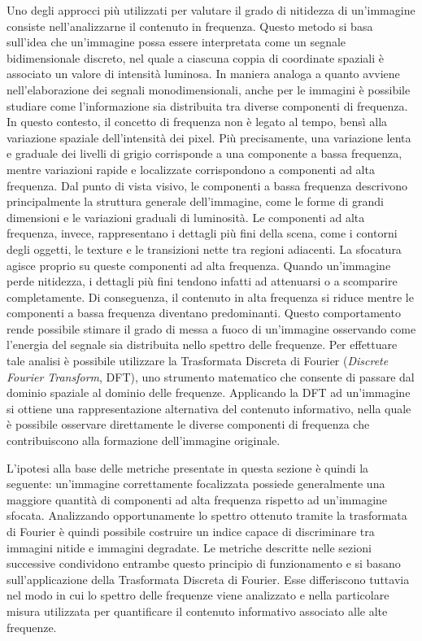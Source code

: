 \documentclass[
    target=bach,
    aauheader=,
    style=
]{thud}
\begin{document}
Uno degli approcci più utilizzati per valutare il grado di nitidezza di un'immagine consiste nell'analizzarne il contenuto in frequenza. Questo metodo si basa sull'idea che un'immagine possa essere interpretata come un segnale bidimensionale discreto, nel quale a ciascuna coppia di coordinate spaziali è associato un valore di intensità luminosa. In maniera analoga a quanto avviene nell'elaborazione dei segnali monodimensionali, anche per le immagini è possibile studiare come l'informazione sia distribuita tra diverse componenti di frequenza. In questo contesto, il concetto di frequenza non è legato al tempo, bensì alla variazione spaziale dell'intensità dei pixel. Più precisamente, una variazione lenta e graduale dei livelli di grigio corrisponde a una componente a bassa frequenza, mentre variazioni rapide e localizzate corrispondono a componenti ad alta frequenza. Dal punto di vista visivo, le componenti a bassa frequenza descrivono principalmente la struttura generale dell'immagine, come le forme di grandi dimensioni e le variazioni graduali di luminosità. Le componenti ad alta frequenza, invece, rappresentano i dettagli più fini della scena, come i contorni degli oggetti, le texture e le transizioni nette tra regioni adiacenti. La sfocatura agisce proprio su queste componenti ad alta frequenza. Quando un'immagine perde nitidezza, i dettagli più fini tendono infatti ad attenuarsi o a scomparire completamente. Di conseguenza, il contenuto in alta frequenza si riduce mentre le componenti a bassa frequenza diventano predominanti. Questo comportamento rende possibile stimare il grado di messa a fuoco di un'immagine osservando come l'energia del segnale sia distribuita nello spettro delle frequenze. Per effettuare tale analisi è possibile utilizzare la Trasformata Discreta di Fourier (\textit{Discrete Fourier Transform}, DFT), uno strumento matematico che consente di passare dal dominio spaziale al dominio delle frequenze. Applicando la DFT ad un'immagine si ottiene una rappresentazione alternativa del contenuto informativo, nella quale è possibile osservare direttamente le diverse componenti di frequenza che contribuiscono alla formazione dell'immagine originale.

L'ipotesi alla base delle metriche presentate in questa sezione è quindi la seguente: un'immagine correttamente focalizzata possiede generalmente una maggiore quantità di componenti ad alta frequenza rispetto ad un'immagine sfocata. Analizzando opportunamente lo spettro ottenuto tramite la trasformata di Fourier è quindi possibile costruire un indice capace di discriminare tra immagini nitide e immagini degradate. Le metriche descritte nelle sezioni successive condividono entrambe questo principio di funzionamento e si basano sull'applicazione della Trasformata Discreta di Fourier. Esse differiscono tuttavia nel modo in cui lo spettro delle frequenze viene analizzato e nella particolare misura utilizzata per quantificare il contenuto informativo associato alle alte frequenze.
\end{document}
